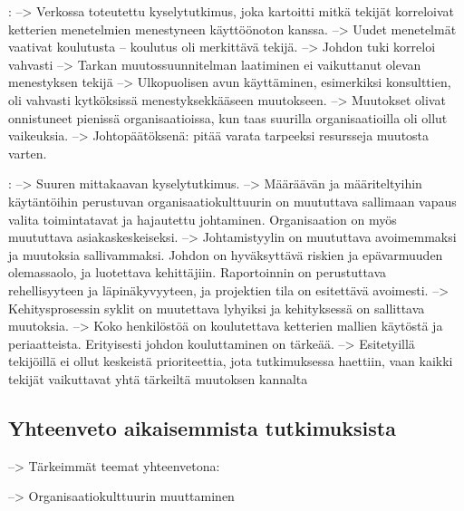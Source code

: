 \citep{Livermore2008}:
--> Verkossa toteutettu kyselytutkimus, joka kartoitti mitkä tekijät korreloivat
ketterien menetelmien menestyneen käyttöönoton kanssa. \newline
--> Uudet menetelmät vaativat koulutusta -- koulutus oli merkittävä tekijä. \newline
--> Johdon tuki korreloi vahvasti \newline
--> Tarkan muutossuunnitelman laatiminen ei vaikuttanut olevan menestyksen tekijä \newline
--> Ulkopuolisen avun käyttäminen, esimerkiksi konsulttien, oli vahvasti
kytköksissä menestyksekkääseen muutokseen. \newline
--> Muutokset olivat onnistuneet pienissä organisaatioissa, kun taas suurilla
organisaatioilla oli ollut vaikeuksia. \newline
--> Johtopäätöksenä: pitää varata tarpeeksi resursseja muutosta varten.

\citep{Misra2009}:
--> Suuren mittakaavan kyselytutkimus. \newline
--> Määräävän ja määriteltyihin käytäntöihin perustuvan organisaatiokulttuurin
on muututtava sallimaan vapaus valita toimintatavat ja hajautettu johtaminen.
Organisaation on myös muututtava asiakaskeskeiseksi. \newline
--> Johtamistyylin on muututtava avoimemmaksi ja muutoksia sallivammaksi. Johdon
on hyväksyttävä riskien ja epävarmuuden olemassaolo, ja luotettava kehittäjiin.
Raportoinnin on perustuttava rehellisyyteen ja läpinäkyvyyteen, ja projektien
tila on esitettävä avoimesti. \newline 
--> Kehitysprosessin syklit on muutettava lyhyiksi ja kehityksessä on sallittava
muutoksia. \newline
--> Koko henkilöstöä on koulutettava ketterien mallien käytöstä ja periaatteista.
Erityisesti johdon kouluttaminen on tärkeää. \newline
--> Esitetyillä tekijöillä ei ollut keskeistä prioriteettia, jota tutkimuksessa
haettiin, vaan kaikki tekijät vaikuttavat yhtä tärkeiltä muutoksen kannalta

\subsection{Yhteenveto aikaisemmista tutkimuksista}

--> Tärkeimmät teemat yhteenvetona:

--> Organisaatiokulttuurin muuttaminen

